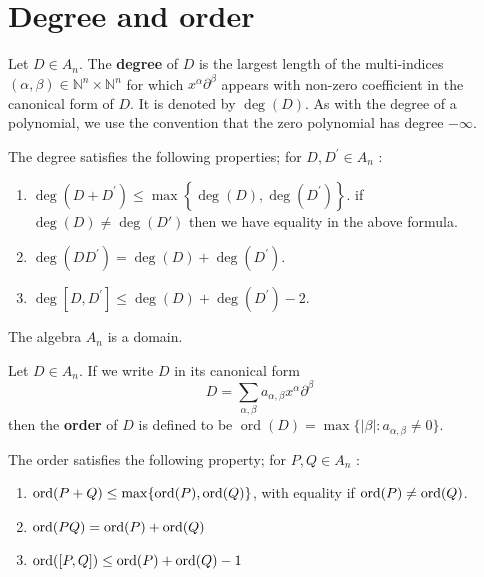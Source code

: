 \documentclass[12pt, oneside]{book}
\begin{document}
\section{Degree and order}


\begin{definition}
    Let $D \in A_n$.
    The \textbf{degree} of $D$ is the largest length of the multi-indices $(\alpha, \beta) \in \mathbb{N}^n \times \mathbb{N}^n$ for which $x^\alpha \partial^\beta$ appears with non-zero coefficient in the canonical form of $D$. It is denoted by $\operatorname{deg}(D)$. As with the degree of a polynomial, we use the convention that the zero polynomial has degree $-\infty$.
\end{definition}


\begin{theorem}
    The degree satisfies the following properties; for $D, D^{\prime} \in A_n$ :
    \begin{enumerate}
        \item
              $\operatorname{deg}\left(D+D^{\prime}\right) \leq \max \left\{\operatorname{deg}(D), \operatorname{deg}\left(D^{\prime}\right)\right\}$.
              if $\deg(D) \neq \deg(D')$ then we have equality in the above formula.
        \item
              $\operatorname{deg}\left(D D^{\prime}\right)=\operatorname{deg}(D)+\operatorname{deg}\left(D^{\prime}\right)$.
        \item
              $\operatorname{deg}\left[D, D^{\prime}\right] \leq \operatorname{deg}(D)+\operatorname{deg}\left(D^{\prime}\right)-2$.
    \end{enumerate}
\end{theorem}

\begin{corollary}
    The algebra $A_n$ is a domain.
\end{corollary}


\begin{definition}
    Let $D \in A_n$. If we write $D$ in its canonical form
    \begin{equation*}
        D=\sum_{\alpha, \beta} a_{\alpha, \beta} x^\alpha \partial^\beta
    \end{equation*}
    then the \textbf{order} of $D$ is defined to be $\operatorname{ord}(D)=\max \{|\beta|: a_{\alpha, \beta} \neq 0\}$.
\end{definition}
\begin{proposition}
    The order satisfies the following property; for $P, Q \in A_n$ :
    \begin{enumerate}
        \item   $\operatorname{\operatorname{ord}}(P+Q) \leq \max\{\operatorname{\operatorname{ord}}(P),\operatorname{\operatorname{ord}}(Q)\}$, with equality if $\operatorname{\operatorname{ord}}(P) \neq \operatorname{\operatorname{ord}}(Q)$.
        \item $\operatorname{\operatorname{ord}} (PQ)= \operatorname{\operatorname{ord}}(P)+\operatorname{\operatorname{ord}}(Q)$
        \item $\operatorname{\operatorname{ord}}([P,Q]) \leq \operatorname{\operatorname{ord}}(P)+\operatorname{\operatorname{ord}}(Q)-1$

    \end{enumerate}
\end{proposition}
\end{document}
